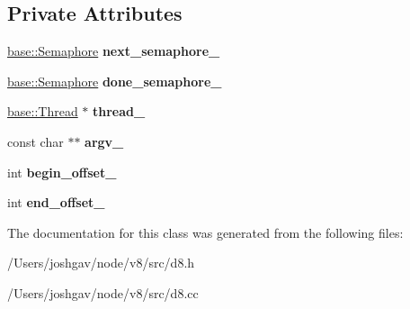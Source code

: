 \subsection*{Private Attributes}
\begin{DoxyCompactItemize}
\item 
\hyperlink{classv8_1_1base_1_1_semaphore}{base\+::\+Semaphore} {\bfseries next\+\_\+semaphore\+\_\+}\hypertarget{classv8_1_1_source_group_a6f8d7c8de09d285f0364791518d5b7fd}{}\label{classv8_1_1_source_group_a6f8d7c8de09d285f0364791518d5b7fd}

\item 
\hyperlink{classv8_1_1base_1_1_semaphore}{base\+::\+Semaphore} {\bfseries done\+\_\+semaphore\+\_\+}\hypertarget{classv8_1_1_source_group_a4ea18d97cbc53472844d0cf3e2b389f5}{}\label{classv8_1_1_source_group_a4ea18d97cbc53472844d0cf3e2b389f5}

\item 
\hyperlink{classv8_1_1base_1_1_thread}{base\+::\+Thread} $\ast$ {\bfseries thread\+\_\+}\hypertarget{classv8_1_1_source_group_a243924c1bb052d2e8d6a400e42675078}{}\label{classv8_1_1_source_group_a243924c1bb052d2e8d6a400e42675078}

\item 
const char $\ast$$\ast$ {\bfseries argv\+\_\+}\hypertarget{classv8_1_1_source_group_aa924532a1282cc2cd7560c0dcafe5659}{}\label{classv8_1_1_source_group_aa924532a1282cc2cd7560c0dcafe5659}

\item 
int {\bfseries begin\+\_\+offset\+\_\+}\hypertarget{classv8_1_1_source_group_addb30cd8162cf3f79510f11ef852b03e}{}\label{classv8_1_1_source_group_addb30cd8162cf3f79510f11ef852b03e}

\item 
int {\bfseries end\+\_\+offset\+\_\+}\hypertarget{classv8_1_1_source_group_a9960c87c1ff7fe498629f16759af7820}{}\label{classv8_1_1_source_group_a9960c87c1ff7fe498629f16759af7820}

\end{DoxyCompactItemize}


The documentation for this class was generated from the following files\+:\begin{DoxyCompactItemize}
\item 
/\+Users/joshgav/node/v8/src/d8.\+h\item 
/\+Users/joshgav/node/v8/src/d8.\+cc\end{DoxyCompactItemize}
